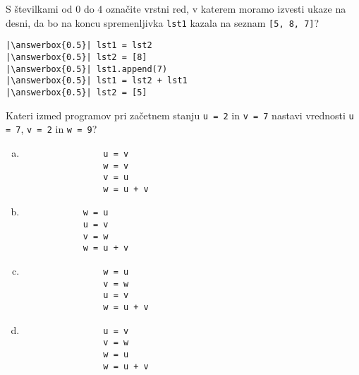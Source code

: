 \documentclass[arhiv, 10pt]{../izpit}
\newcommand{\inlinepy}[1]{\texttt{#1}}
\newcommand{\answerbox}[1]{\framebox{\vphantom{\large M}\hspace{#1cm}}}
\begin{document}
        \naloga*
        \begin{multicols}{2}
        \noindent 
        S številkami od $0$ do $4$ označite vrstni red, v katerem moramo izvesti ukaze na desni, da bo na koncu spremenljivka \inlinepy{lst1} kazala na seznam \inlinepy{[5, 8, 7]}?
    
        \columnbreak
        \noindent
        \begin{verbatim}
|\answerbox{0.5}| lst1 = lst2
|\answerbox{0.5}| lst2 = [8]
|\answerbox{0.5}| lst1.append(7)
|\answerbox{0.5}| lst1 = lst2 + lst1
|\answerbox{0.5}| lst2 = [5]

        \end{verbatim}
        \end{multicols}
    
            
        \naloga*
        
        Kateri izmed programov pri začetnem stanju
            \inlinepy{u = 2} in
            \inlinepy{v = 7}
        nastavi vrednosti
            \inlinepy{u = 7},
            \inlinepy{v = 2} in
            \inlinepy{w = 9}?
    
        \begin{multicols}{4}
        \begin{enumerate}[(a)]
\item 
                \begin{verbatim}
                u = v
                w = v
                v = u
                w = u + v
                \end{verbatim}
            
\item 
            \begin{verbatim}
            w = u
            u = v
            v = w
            w = u + v
            \end{verbatim}
        
\item 
                \begin{verbatim}
                w = u
                v = w
                u = v
                w = u + v
                \end{verbatim}
            
\item 
                \begin{verbatim}
                u = v
                v = w
                w = u
                w = u + v
                \end{verbatim}
            
\end{enumerate}

        \end{multicols}
    
\end{document}
